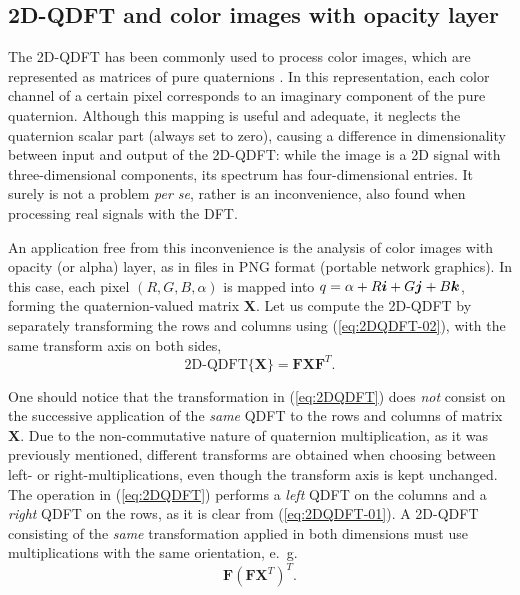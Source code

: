 \subsection{2D-QDFT and color images with opacity layer}
\label{subsec:2D_QDFT}
The 2D-QDFT has been commonly used to process color images, which are represented as matrices of pure quaternions \cite{lu20072d,ell2006hypercomplex,chen2018multiple}. In this representation, each color channel of a certain pixel corresponds to an imaginary component of the pure quaternion. Although this mapping is useful and adequate, it neglects the quaternion scalar part (always set to zero), causing a difference in dimensionality between input and output of the 2D-QDFT: while the image is a 2D signal with three-dimensional components, its spectrum has four-dimensional entries. It surely is not a problem \textit{per se}, rather is an inconvenience, also found when processing real signals with the DFT.

An application free from this inconvenience is the analysis of color images with opacity (or alpha) layer, as in files in PNG format (portable network graphics). In this case, each pixel $ (R,G,B,\alpha) $ is mapped into $ q = \alpha + R \boldsymbol{i} + G \boldsymbol{j} + B \boldsymbol{k} $, forming the quaternion-valued matrix $ \mathbf{X} $. Let us compute the 2D-QDFT by separately transforming the rows and columns using (\ref{eq:2DQDFT-02}), with the same transform axis on both sides,
\begin{equation}
\label{eq:2DQDFT}
\text{2D-QDFT}\{\mathbf{X} \} = \mathbf{F} \mathbf{X} \mathbf{F}^T.
\end{equation}

One should notice that the transformation in (\ref{eq:2DQDFT}) does \textit{not} consist on the successive application of the \textit{same} QDFT to the rows and columns of matrix $ \mathbf{X} $. Due to the non-commutative nature of quaternion multiplication, as it was previously mentioned, different transforms are obtained when choosing between left- or right-multiplications, even though the transform axis is kept unchanged. The operation in (\ref{eq:2DQDFT}) performs a \textit{left} QDFT on the columns and a \textit{right} QDFT on the rows, as it is clear from (\ref{eq:2DQDFT-01}). A 2D-QDFT consisting of the \textit{same} transformation applied in both dimensions must use multiplications with the same orientation, e.~g.
\begin{equation}
\label{eq:2DQDFTv2}
\mathbf{F} \left( \mathbf{F}\mathbf{X}^T \right)^T.
\end{equation}

